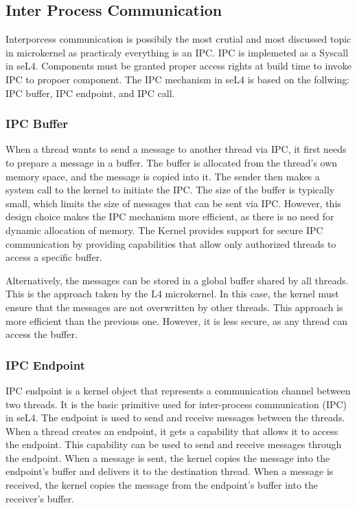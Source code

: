 \documentclass[
	a4paper, %
	11pt, %
	unnumberedsections, %
	twoside, %
]{LTJournalArticle}
\begin{document}
\subsection{Inter Process Communication}
Interporcess communication is possibily the most crutial and most discussed topic in microkernel as practicaly everything is an IPC. IPC is implemeted as a Syscall in seL4. Components must be granted proper access rights at build time to invoke IPC to propoer component. The IPC mechanism in seL4 is based on the follwing: IPC buffer, IPC endpoint, and IPC call.

\subsubsection{IPC Buffer}
When a thread wants to send a message to another thread via IPC, it first needs to prepare a message in a buffer. The buffer is allocated from the thread's own memory space, and the message is copied into it. The sender then makes a system call to the kernel to initiate the IPC. The size of the buffer is typically small, which limits the size of messages that can be sent via IPC. However, this design choice makes the IPC mechanism more efficient, as there is no need for dynamic allocation of memory. The Kernel provides support for secure IPC communication by providing capabilities that allow only authorized threads to access a specific buffer.

Alternatively, the messages can be stored in a global buffer shared by all threads. This is the approach taken by the L4 microkernel. In this case, the kernel must ensure that the messages are not overwritten by other threads.  This approach is more efficient than the previous one. However, it is less secure, as any thread can access the buffer.


\subsubsection{IPC Endpoint}
IPC endpoint is a kernel object that represents a communication channel between two threads. It is the basic primitive used for inter-process communication (IPC) in seL4. The endpoint is used to send and receive messages between the threads. When a thread creates an endpoint, it gets a capability that allows it to access the endpoint. This capability can be used to send and receive messages through the endpoint. When a message is sent, the kernel copies the message into the endpoint's buffer and delivers it to the destination thread. When a message is received, the kernel copies the message from the endpoint's buffer into the receiver's buffer.
\end{document}
